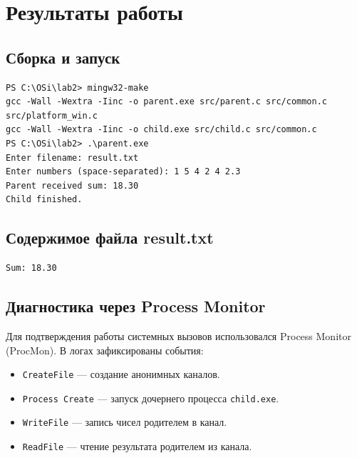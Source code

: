\section*{Результаты работы}

\subsection*{Сборка и запуск}
\begin{verbatim}
PS C:\OSi\lab2> mingw32-make
gcc -Wall -Wextra -Iinc -o parent.exe src/parent.c src/common.c src/platform_win.c
gcc -Wall -Wextra -Iinc -o child.exe src/child.c src/common.c
PS C:\OSi\lab2> .\parent.exe
Enter filename: result.txt
Enter numbers (space-separated): 1 5 4 2 4 2.3
Parent received sum: 18.30
Child finished.
\end{verbatim}

\subsection*{Содержимое файла result.txt}
\begin{verbatim}
Sum: 18.30
\end{verbatim}

\subsection*{Диагностика через Process Monitor}
Для подтверждения работы системных вызовов использовался Process Monitor (ProcMon). В логах зафиксированы события:
\begin{itemize}
    \item \texttt{CreateFile} — создание анонимных каналов.
    \item \texttt{Process Create} — запуск дочернего процесса \texttt{child.exe}.
    \item \texttt{WriteFile} — запись чисел родителем в канал.
    \item \texttt{ReadFile} — чтение результата родителем из канала.
\end{itemize}